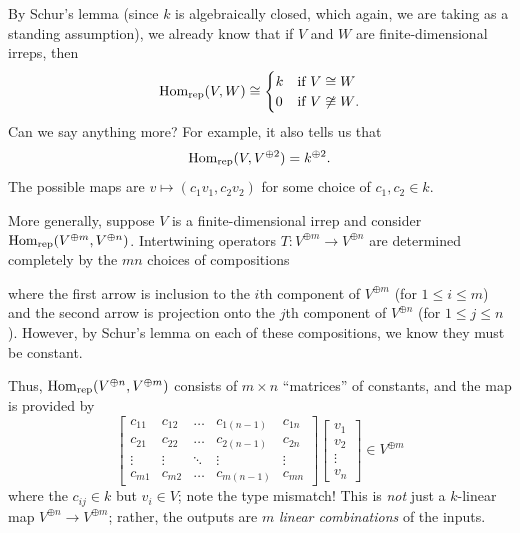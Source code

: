 By Schur's lemma (since $k$ is algebraically closed,
which again, we are taking as a standing assumption),
we already know that if $V$ and $W$ are finite-dimensional irreps, then
\[
	\operatorname{Hom}_{\mathrm{rep}}(V,W) \cong
	\begin{cases}
		k & \text{if $V \cong W$} \\
		0 & \text{if $V \not\cong W$}.
	\end{cases}
\]
Can we say anything more?
For example, it also tells us that
\[ \operatorname{Hom}_{\mathrm{rep}}(V, V^{\oplus 2}) = k^{\oplus 2}. \]
The possible maps are $v \mapsto (c_1v_1, c_2v_2)$ for some choice of $c_1, c_2 \in k$.

More generally, suppose $V$ is a finite-dimensional irrep and consider
$\operatorname{Hom}_{\mathrm{rep}}(V^{\oplus m}, V^{\oplus n})$.
Intertwining operators
$T \colon V^{\oplus m} \to V^{\oplus n}$
are determined completely
by the $mn$ choices of compositions
\begin{center}
\end{center}
where the first arrow is inclusion to the $i$th component of $V^{\oplus m}$
(for $1 \le i \le m$) and the second arrow is projection onto the $j$th
component of $V^{\oplus n}$ (for $1 \le j \le n$).
However, by Schur's lemma on each of these compositions,
we know they must be constant.

Thus, $\operatorname{Hom}_{\mathrm{rep}}(V^{\oplus n}, V^{\oplus m})$ consists of $m \times n$ ``matrices''
of constants, and the map is provided by
\[
	\begin{bmatrix}
		c_{11} & c_{12} & \dots & c_{1(n-1)} & c_{1n} \\
		c_{21} & c_{22} & \dots & c_{2(n-1)} & c_{2n} \\
		\vdots & \vdots & \ddots & \vdots & \vdots \\
		c_{m1} & c_{m2} & \dots & c_{m(n-1)} & c_{mn}
	\end{bmatrix}
	\begin{bmatrix} v_1 \\ v_2 \\ \vdots \\ v_n \end{bmatrix}
	\in V^{\oplus m}
\]
where the $c_{ij} \in k$ but $v_i \in V$; note the type mismatch!
This is \emph{not} just a $k$-linear map $V^{\oplus n} \to V^{\oplus m}$;
rather, the outputs are $m$ \emph{linear combinations} of the inputs.

